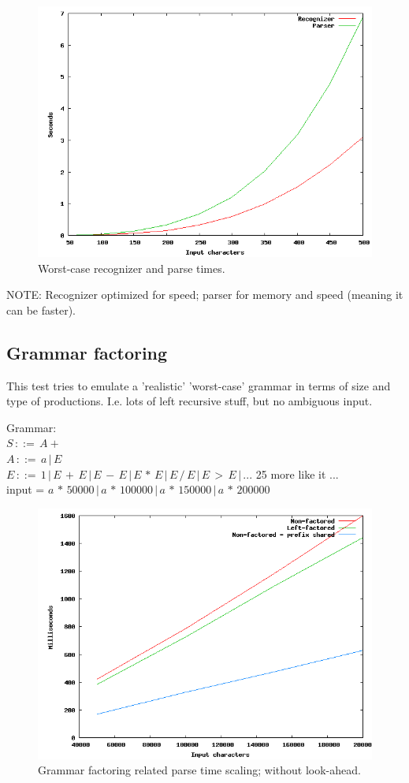 \documentclass[a4paper,10pt]{article}
\begin{document}
\begin{figure}[H]
\centering
\includegraphics[width=1\textwidth]{worst-case.png}
\caption{Worst-case recognizer and parse times.}
\end{figure}

NOTE: Recognizer optimized for speed; parser for memory and speed (meaning it can be faster).

\subsection{Grammar factoring}

This test tries to emulate a 'realistic' 'worst-case' grammar in terms of size and type of productions. I.e. lots of left recursive stuff, but no ambiguous input.

Grammar:\\
$S\,::=\,A+$\\
$A\,::=\,a\,|\,E$\\
$E\,::=\,1\,|\,E\,+\,E\,|\,E\,-\,E\,|\,E\,*\,E\,|\,E\,/\,E\,|\,E\,>\,E\,|\,...$ 25 more like it ...\\
input = $a\,*\,50000\,|\,a\,*\,100000\,|\,a\,*\,150000\,|\,a\,*\,200000$

\begin{figure}[H]
\centering
\includegraphics[width=1\textwidth]{grammar-factoring.png}
\caption{Grammar factoring related parse time scaling; without look-ahead.}
\end{figure}
\end{document}
